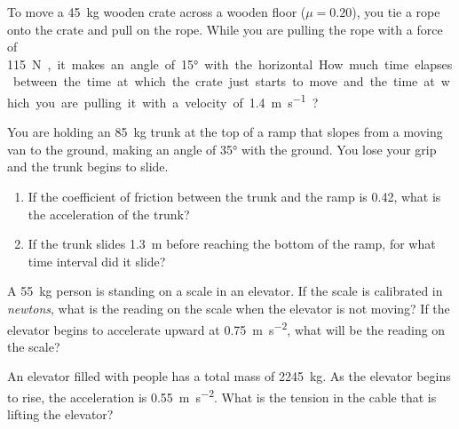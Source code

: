 \begin{example}
  To move a \SI{45}{\kilo\gram} wooden crate across a wooden floor
  ($\mu=0.20$), you tie a rope onto the crate and pull on the rope. While you
  are pulling the rope with a force of \SI{115}\newton, it makes an angle of
  \ang{15} with the horizontal. How much time elapses between the time at which
  the crate just starts to move and the time at which you are pulling it with a
  velocity of \SI{1.4}{\metre\per\second}?
\end{example}

\begin{example}
  You are holding an \SI{85}{\kilo\gram} trunk at the top of a ramp that slopes
  from a moving van to the ground, making an angle of \ang{35} with the ground.
  You lose your grip and the trunk begins to slide.
  \begin{enumerate}
  \item If the coefficient of friction between the trunk and the ramp is 0.42,
    what is the acceleration of the trunk?
  \item If the trunk slides \SI{1.3}{\metre} before reaching the bottom of the
    ramp, for what time interval did it slide?
  \end{enumerate}
\end{example}

\begin{example}
  A \SI{55}{\kilo\gram} person is standing on a scale in an elevator. If the
  scale is calibrated in \emph{newtons}, what is the reading on the scale when
  the elevator is not moving? If the elevator begins to accelerate upward at
  \SI{.75}{\metre\per\second\squared}, what will be the reading on the scale?
\end{example}



\begin{example}
  An elevator filled with people has a total mass of \SI{2245}{\kilo\gram}. As
  the elevator begins to rise, the acceleration is
  \SI{.55}{\metre\per\second\squared}. What is the tension in the cable that is
  lifting the elevator?   
\end{example}



